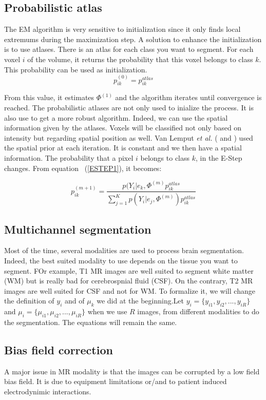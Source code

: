 \subsection{Probabilistic atlas}
The EM algorithm is very sensitive to initialization since it only finds local extremums during the maximization step. A solution to enhance the initialization is to use atlases. There is an atlas for each class you want to segment. For each voxel $i$ of the volume, it returns the probability that this voxel belongs to class $k$. This probability can be used as initialization.
  \begin{equation}
  p_{ik}^{(0)} = p_{ik}^{atlas}
  \end{equation}   

From this value, it estimates $\Phi^{(1)}$ and the algorithm iterates until convergence is reached. The probabilistic atlases are not only used to inialize the process. It is also use to get a more robust algorithm. Indeed, we can use the spatial information given by the atlases. Voxels will be classified not only based on intensity but regarding spatial position as well. Van Lemput \textit{et al.} (\cite{8} and \cite{9}) used the spatial prior at each iteration. It is constant and we then have a spatial information. The probability that a pixel $i$ belongs to class $k$, in the E-Step changes. From equation ~(\ref{ESTEP1}), it becomes:

  \begin{equation}\label{ESTEP2}
  p_{ik}^{(m+1)} = \frac{p(Y_i|e_k,\Phi^{(m)}p_{ik}^{atlas}}{\sum_{j=1}^K   p(Y_i|e_j,\Phi^{(m)}) p_{ik}^{atlas}}  
  \end{equation}

%
\subsection{Multichannel segmentation}
Most of the time, several modalities are used to process brain segmentation. Indeed, the best suited modality to use depends on the tissue you want to segment. FOr example, T1 MR images are well suited to segment white matter (WM) but is really bad for cerebrospnial fluid (CSF). On the contrary, T2 MR images are well suited for CSF and not for WM. To formalize it, we will change the definition of $y_i$ and of $\mu_k$ we did at the beginning.Let $y_i = \{y_{i1},y_{i2}, ..., y_{iR}\}$ and $\mu_i = \{\mu_{i1},\mu_{i2}, ..., \mu_{iR}\}$ when we use $R$ images, from different modalities to do the segmentation. The equations will remain the same.
%
\subsection{Bias field correction}
A major issue in MR modality is that the images can be corrupted by a low field bias field. It is due to equipment limitations or/and to patient induced electrodynimic interactions.
%
